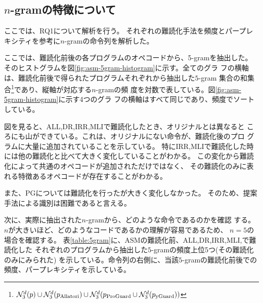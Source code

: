 \documentclass[conference]{IEEEtran}
\newcommand{\distinctnnn}[1]{\mathcal{N}_3^d(#1)}
\begin{document}
\subsection{$n$-gramの特徴について}
ここでは、RQ1について解析を行う。
それぞれの難読化手法を頻度とパープレキシティを参考に$n$-gramの命令列を解析した。

ここでは、難読化前後の各プログラムのオペコードから、5-gramを抽出した。
そのヒストグラムを図\ref{fig:asm-5gram-histogram}に示す。全てのグラ
フの横軸は、難読化前後で得られたプログラムそれぞれから抽出した$5$-gram
集合の和集合\footnote{ $\distinctnnn{p} \cup \distinctnnn{p_{\rm
      Allatori}} \cup \distinctnnn{p_{\rm ProGuard} \cup
    \distinctnnn{p_{\rm yGuard}}}$}であり、縦軸が対応する$n$-gramの頻
度を対数で表している。図\ref{fig:asm-5gram-histogram}に示す4つのグラ
フの横軸はすべて同じであり、頻度でソートしている。

図を見ると、ALL,DR,IRR,MLIで難読化したとき、オリジナルとは異なると
ころにも山ができている。これは、オリジナルにない命令が、難読化後のプロ
グラムに大量に追加されていることを示している。
特にIRR,MLIで難読化した時には他の難読化と比べて大きく変化していることがわかる。
この変化から難読化によって共通のオペコードが追加されただけではなく、
その難読化のみに表れる特徴あるオペコードが存在することがわかる。

また、PGについては難読化を行ったが大きく変化しなかった。
そのため、提案手法による識別は困難であると言える。

%

次に、実際に抽出された$n$-gramから、どのような命令であるのかを確認
する。$n$が大きいほど、どのようなコードであるかの理解が容易であるため、
$n=5$の場合を確認する。
%
表\ref{table:5gram}に、ASMの難読化前、ALL,DR,IRR,MLI,で難読化した
それぞれのプログラムから抽出した$5$-gramの頻度上位5つ(その難読化のみにみられた) を示している。命令列の右側に、当該$5$-gramの難読化前後での頻度、パープレキシティを示している。


\end{document}
